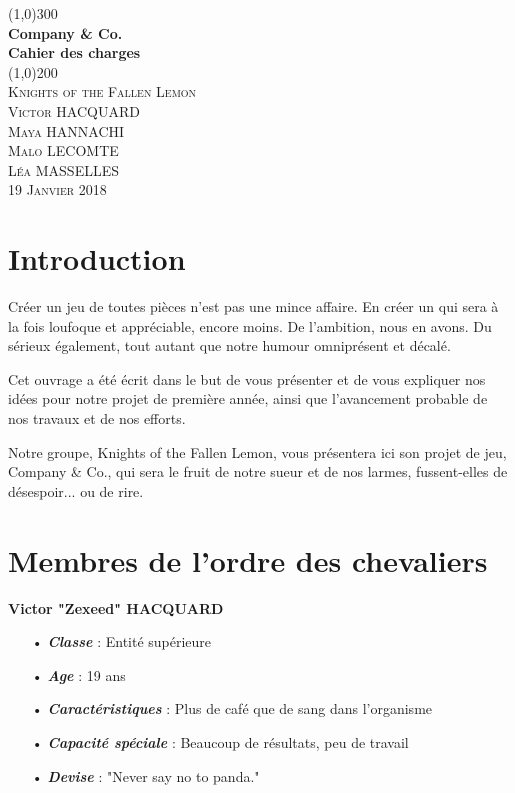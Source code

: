 \documentclass{article}
\begin{document}
\begin{titlepage} 
	\begin{center}
	\line(1,0){300}\\
	[2mm]
	\huge{\bfseries Company \& Co. \\Cahier des charges}\\
	[1mm]
	\line(1,0){200}\\
	[1.5 cm]
	\textsc{\LARGE Knights of the Fallen Lemon}\\
	[0.75 cm]
	\textsc{\Large Victor HACQUARD\\Maya HANNACHI\\Malo LECOMTE\\Léa MASSELLES}\\
	[1 cm]
	\textsc{\large 19 Janvier 2018}
	\end{center}
\end{titlepage}

\tableofcontents
\newpage

\section*{Introduction}
Créer un jeu de toutes pièces n'est pas une mince affaire. En créer un qui sera à la fois loufoque et appréciable, encore moins.
De l'ambition, nous en avons. Du sérieux également, tout autant que notre humour omniprésent et décalé.

Cet ouvrage a été écrit dans le but de vous présenter et de vous expliquer nos idées pour notre projet de première année, ainsi que l'avancement probable de nos travaux et de nos efforts.

Notre groupe, Knights of the Fallen Lemon, vous présentera ici son projet de jeu, Company \& Co., qui sera le fruit de notre sueur et de nos larmes, fussent-elles de désespoir... ou de rire.
\section{Membres de l'ordre des chevaliers}
\vspace{0.3cm}\hspace{-0.7cm}
\textbf{Victor "Zexeed" HACQUARD}
\begin{itemize}
\item[•] \textbf{\textit{Classe}} : Entité supérieure
\item[•] \textbf{\textit{Age}} : 19 ans
\item[•] \textbf{\textit{Caractéristiques}} : Plus de café que de sang dans l'organisme
\item[•] \textbf{\textit{Capacité spéciale}} : Beaucoup de résultats, peu de travail
\item[•] \textbf{\textit{Devise}} : "Never say no to panda."
\end{itemize}
\end{document}
